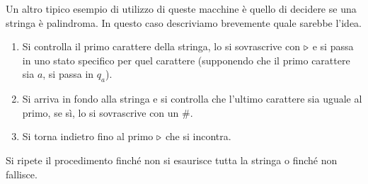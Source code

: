Un altro tipico esempio di utilizzo di queste macchine è
quello di decidere se una stringa è palindroma. In questo
caso descriviamo brevemente quale sarebbe l'idea.
\begin{enumerate}
	\item Si controlla il primo carattere della stringa, lo si
	      sovrascrive con $\triangleright$ e si passa in uno stato
	      specifico per quel carattere (supponendo che il primo
	      carattere sia $a$, si passa in $q_a$).
	\item Si arriva in fondo alla stringa e si controlla che
	      l'ultimo carattere sia uguale al primo, se sì, lo
	      si sovrascrive con un $\#$.
	\item Si torna indietro fino al primo $\triangleright$ che si
	      incontra.
\end{enumerate}
Si ripete il procedimento finché non si esaurisce tutta la
stringa o finché non fallisce.